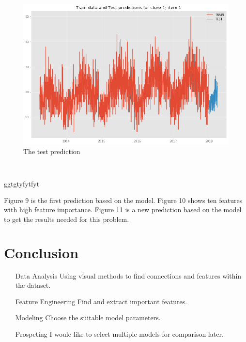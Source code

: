 \begin{figure}[htbp]
	\centering
	
  \includegraphics[scale=0.7]{logos/014.eps}
	\caption{ The test prediction }\label{fig:010.eps}
\end{figure}
\ 

ggtgtyfytfyt

Figure 9 is the first prediction based on the model. Figure 10 
shows ten features with high feature importance. Figure 11 is a new
prediction based on the model to get the results needed for this problem.

\section{Conclusion}
\begin{itemize}
	\item[Data Analysis] Using visual methods to find connections and features within the dataset.
	\item[Feature Engineering] Find and extract important features. 
	\item[Modeling] Choose the suitable model parameters.
	\item[Prospcting] I woule like to select multiple models for comparison later.
\end{itemize}





